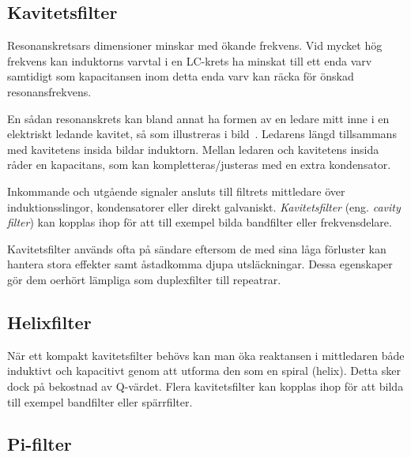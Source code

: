 \subsection{Kavitetsfilter}


Resonanskretsars dimensioner minskar med ökande frekvens.
Vid mycket hög frekvens kan induktorns varvtal i en LC-krets ha minskat till
ett enda varv samtidigt som kapacitansen inom detta enda varv kan räcka för
önskad resonansfrekvens.

En sådan resonanskrets kan bland annat ha formen av en ledare mitt inne i en
elektriskt ledande kavitet, så som illustreras i bild~.
Ledarens längd tillsammans med kavitetens insida bildar induktorn.
Mellan ledaren och kavitetens insida råder en kapacitans, som kan
kompletteras/justeras med en extra kondensator.

Inkommande och utgående signaler ansluts till filtrets mittledare över
induktionsslingor, kondensatorer eller direkt galvaniskt.
\emph{Kavitetsfilter} (eng. \emph{cavity filter}) kan kopplas ihop för att till
exempel bilda bandfilter eller frekvensdelare.

Kavitetsfilter används ofta på sändare eftersom de med sina låga förluster kan
hantera stora effekter samt åstadkomma djupa utsläckningar.
Dessa egenskaper gör dem oerhört lämpliga som duplexfilter till repeatrar.


\subsection{Helixfilter}

När ett kompakt kavitetsfilter behövs kan man öka reaktansen i mittledaren
både induktivt och kapacitivt genom att utforma den som en spiral (helix).
Detta sker dock på bekostnad av Q-värdet.
Flera kavitetsfilter kan kopplas ihop för att bilda till exempel bandfilter
eller spärrfilter.

\subsection{Pi-filter}


